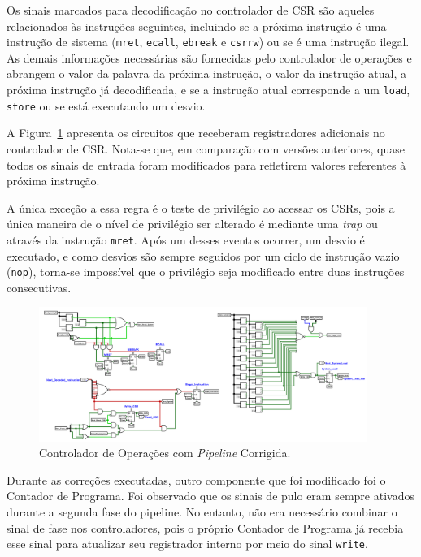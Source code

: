 \documentclass[
	12pt,				%
	openright,			%
	oneside,			%
	a4paper,			%
	english,			%
	french,				%
	spanish,			%
	brazil,				%
	]{abntex2}
\begin{document}
Os sinais marcados para decodificação no controlador de CSR são aqueles relacionados às instruções seguintes, incluindo se a próxima instrução é uma instrução de sistema (\texttt{mret}, \texttt{ecall}, \texttt{ebreak} e \texttt{csrrw}) ou se é uma instrução ilegal. As demais informações necessárias são fornecidas pelo controlador de operações e abrangem o valor da palavra da próxima instrução, o valor da instrução atual, a próxima instrução já decodificada, e se a instrução atual corresponde a um \texttt{load}, \texttt{store} ou se está executando um desvio.

A Figura~\ref{fig:Controlador_CSR_Pipeline_Fix} apresenta os circuitos que receberam registradores adicionais no controlador de CSR. Nota-se que, em comparação com versões anteriores, quase todos os sinais de entrada foram modificados para refletirem valores referentes à próxima instrução.

A única exceção a essa regra é o teste de privilégio ao acessar os CSRs, pois a única maneira de o nível de privilégio ser alterado é mediante uma \textit{trap} ou através da instrução \texttt{mret}. Após um desses eventos ocorrer, um desvio é executado, e como desvios são sempre seguidos por um ciclo de instrução vazio (\texttt{nop}), torna-se impossível que o privilégio seja modificado entre duas instruções consecutivas.

\begin{figure}[h]
    \centering
    \includegraphics[width=0.95\textwidth]{ProcessoDesenvolvimento/Arquitetura/CSR_Controller_Pipeline_Fix1.png}
    \caption{Controlador de Operações com \textit{Pipeline} Corrigida.}
    \label{fig:Controlador_CSR_Pipeline_Fix}
\end{figure}

Durante as correções executadas, outro componente que foi modificado foi o Contador de Programa. Foi observado que os sinais de pulo eram sempre ativados durante a segunda fase do pipeline. No entanto, não era necessário combinar o sinal de fase nos controladores, pois o próprio Contador de Programa já recebia esse sinal para atualizar seu registrador interno por meio do sinal \texttt{write}.
\end{document}
